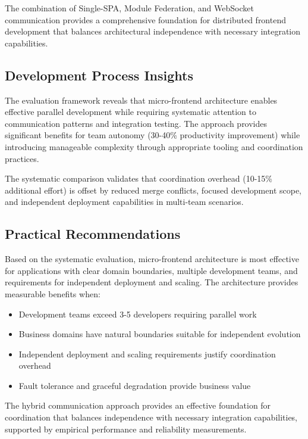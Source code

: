 \documentclass[12pt,a4paper]{report}
\begin{document}
The combination of Single-SPA, Module Federation, and WebSocket communication provides a comprehensive foundation for distributed frontend development that balances architectural independence with necessary integration capabilities.

\subsection{Development Process Insights}

The evaluation framework reveals that micro-frontend architecture enables effective parallel development while requiring systematic attention to communication patterns and integration testing. The approach provides significant benefits for team autonomy (30-40\% productivity improvement) while introducing manageable complexity through appropriate tooling and coordination practices.

The systematic comparison validates that coordination overhead (10-15\% additional effort) is offset by reduced merge conflicts, focused development scope, and independent deployment capabilities in multi-team scenarios.

\subsection{Practical Recommendations}

Based on the systematic evaluation, micro-frontend architecture is most effective for applications with clear domain boundaries, multiple development teams, and requirements for independent deployment and scaling. The architecture provides measurable benefits when:

\begin{itemize}
\item Development teams exceed 3-5 developers requiring parallel work
\item Business domains have natural boundaries suitable for independent evolution
\item Independent deployment and scaling requirements justify coordination overhead
\item Fault tolerance and graceful degradation provide business value
\end{itemize}

The hybrid communication approach provides an effective foundation for coordination that balances independence with necessary integration capabilities, supported by empirical performance and reliability measurements.
\end{document}
